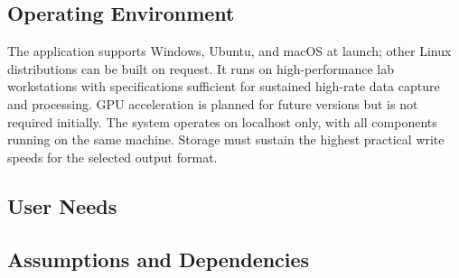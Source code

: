 \documentclass[12pt]{article}
\begin{document}
\subsection{Operating Environment}\label{subsec:operating-environment}
The application supports Windows, Ubuntu, and macOS at launch; other Linux distributions can be built on request. It runs on high-performance lab workstations with specifications sufficient for sustained high-rate data capture and processing. GPU acceleration is planned for future versions but is not required initially. The system operates on localhost only, with all components running on the same machine. Storage must sustain the highest practical write speeds for the selected output format.

\subsection{User Needs}\label{subsec:user-needs}

\subsection{Assumptions and Dependencies}
\end{document}
